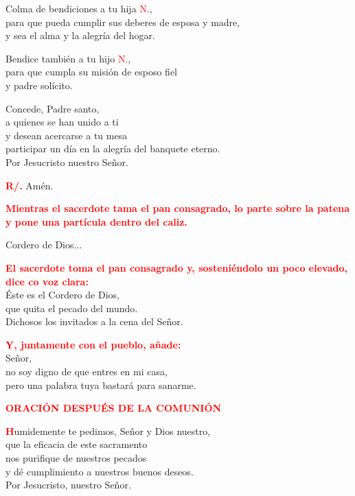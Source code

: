 \documentclass[12pt, letterpaper]{report}
\begin{document}
  Colma de bendiciones a tu hija \textcolor{red}{N.}, \\
  para que pueda cumplir sus deberes de esposa y madre, \\
  y sea el alma y la alegr\'ia del hogar.

  Bendice tambi\'en a tu hijo \textcolor{red}{N.}, \\
  para que cumpla su misi\'on de esposo fiel \\
  y padre sol\'icito.

  Concede, Padre santo, \\
  a quienes se han unido a ti \\
  y desean acercarse a tu mesa \\
  participar un d\'ia en la alegr\'ia del banquete eterno. \\
  Por Jesucristo nuestro Se\~nor.

  \Large \hspace{-0.9cm} {\bfseries \textcolor{red}{R/.}} \hspace{0.5cm} Am\'en.

  \large{\bfseries \textcolor{red}{Mientras el sacerdote tama el pan consagrado, lo parte sobre la patena y pone una part\'icula dentro del caliz.}}

  \Large Cordero de Dios...

  \large{\bfseries \textcolor{red}{El sacerdote toma el pan consagrado y, sosteni\'endolo un poco elevado, dice co voz clara:}}\\
  \Large \'Este es el Cordero de Dios,\\
  que quita el pecado del mundo.\\
  Dichosos los invitados a la cena del Se\~nor.

  \large{\bfseries \textcolor{red}{Y, juntamente con el pueblo, a\~nade:}}\\
  \Large Se\~nor, \\
  no soy digno de que entres en mi casa, \\
  pero una palabra tuya bastar\'a para sanarme.
  
  \clearpage

  \Large {\bfseries \textcolor{red}{ORACI\'ON DESPU\'ES DE LA COMUNI\'ON}}

  \lettrine[lines=1]{\bfseries \textcolor{red}{H}}{}\Large umidemente te pedimos, Se\~nor y Dios nuestro, \\
  que la eficacia de este sacramento \\
  nos purifique de nuestros pecados \\
  y d\'e cumplimiento a nuestros buenos deseos. \\
  Por Jesucristo, nuestro Se\~nor.
\end{document}
